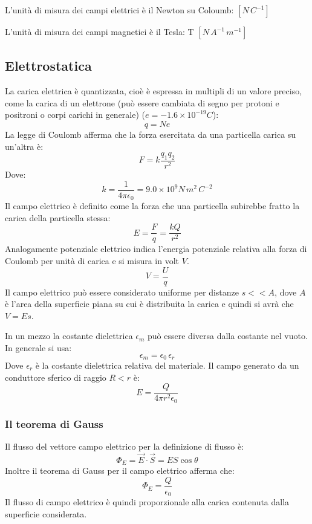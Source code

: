 \documentclass{article}
\begin{document}
L'unità di misura dei campi elettrici è il Newton su Coloumb: $[N\,C^{-1}]$

L'unità di misura dei campi magnetici è il Tesla: T $[N\,A^{-1}\,m^{-1}]$


\subsection{Elettrostatica}
La carica elettrica è quantizzata, cioè è espressa in multipli di un valore preciso, come la carica di un elettrone (può essere cambiata di segno per protoni e positroni o corpi carichi in generale) ($e=-1.6 \times 10^{-19} C$):
\begin{equation}
    q=Ne
\end{equation}
La legge di Coulomb afferma che la forza esercitata da una particella carica su un'altra è:
\begin{equation}
    F=k\frac{q_1 q_2}{r^2}
\end{equation}
Dove:
\begin{equation}
    k=\frac{1}{4\pi\epsilon_0}=9.0\times 10^{9} N\,m^2\,C^{-2}
\end{equation}
Il campo elettrico è definito come la forza che una particella subirebbe fratto la carica della particella stessa:
\begin{equation}
    E=\frac{F}{q}=\frac{kQ}{r^2}
\end{equation}
Analogamente potenziale elettrico indica l'energia potenziale relativa alla forza di Coulomb per unità di carica e si misura in volt $V$.
\begin{equation}
    V=\frac{U}{q}
\end{equation}
Il campo elettrico può essere considerato uniforme per distanze $s<<A$, dove $A$ è l'area della superficie piana su cui è distribuita la carica e quindi si avrà che $V=Es$.

In un mezzo la costante dielettrica $\epsilon_m$ può essere diversa dalla costante nel vuoto. In generale si usa:
\begin{equation}
    \epsilon_m=\epsilon_0\,\epsilon_r
\end{equation}
Dove $\epsilon_r$ è la costante dielettrica relativa del materiale.
Il campo generato da un conduttore sferico di raggio $R<r$ è:
\begin{equation}
    E=\frac{Q}{4\pi r^2\epsilon_0}
\end{equation}

\subsubsection{Il teorema di Gauss}
Il flusso del vettore campo elettrico per la definizione di flusso è:
\begin{equation}
    \Phi_E=\vec{E}\cdot\vec{S}=ES\cos{\theta}
\end{equation}
Inoltre il teorema di Gauss per il campo elettrico afferma che:
\begin{equation}
    \Phi_E=\frac{Q}{\epsilon_0}
\end{equation}
Il flusso di campo elettrico è quindi proporzionale alla carica contenuta dalla superficie considerata.
\end{document}
